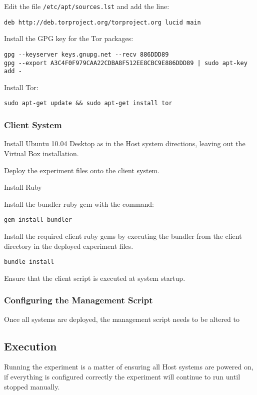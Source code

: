 \begin{enumerate*}
  \item Edit the file \verb+/etc/apt/sources.lst+ and add the line:
  \begin{verbatim}
deb http://deb.torproject.org/torproject.org lucid main
  \end{verbatim}
  \item Install the GPG key for the Tor packages:
  \begin{verbatim}
gpg --keyserver keys.gnupg.net --recv 886DDD89
gpg --export A3C4F0F979CAA22CDBA8F512EE8CBC9E886DDD89 | sudo apt-key add -
  \end{verbatim}
  \item Install Tor:
  \begin{verbatim}
sudo apt-get update && sudo apt-get install tor
  \end{verbatim}
\end{enumerate*}

\subsubsection{Client System}

Install Ubuntu 10.04 Desktop as in the Host system directions, leaving out the Virtual Box installation.

\begin{enumerate*}
  \item Deploy the experiment files onto the client system.
  \item Install Ruby
  \item Install the bundler ruby gem with the command:
    \begin{verbatim}
gem install bundler
    \end{verbatim}
  \item Install the required client ruby gems by executing the bundler from the client directory in the deployed experiment files.
    \begin{verbatim}
bundle install
    \end{verbatim}
  \item Ensure that the client script is executed at system startup.
\end{enumerate*}

\subsubsection{Configuring the Management Script}

Once all systems are deployed, the management script needs to be altered to

\subsection{Execution}

Running the experiment is a matter of ensuring all Host systems are powered on, if everything is configured correctly the experiment will continue to run until stopped manually.
